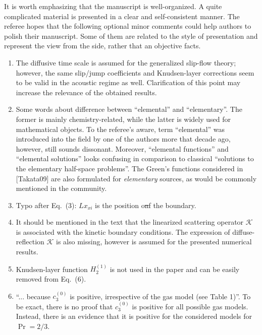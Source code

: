 \documentclass[11pt]{article}
\begin{document}
It is worth emphasizing that the manuscript is well-organized.
A quite complicated material is presented in a clear and self-consistent manner.
The referee hopes that the following optional minor comments could help authors to polish their manuscript.
Some of them are related to the style of presentation and represent the view from the side, rather that an objective facts.
\begin{enumerate}
    \item The diffusive time scale is assumed for the generalized slip-flow theory;
    however, the same slip/jump coefficients and Knudsen-layer corrections seem to be valid in the acoustic regime as well.
    Clarification of this point may increase the relevance of the obtained results.

    \item Some words about difference between ``elemental'' and ``elementary''.
    The former is mainly chemistry-related, while the latter is widely used for mathematical objects.
    To the referee's aware, term ``elemental'' was introduced into the field by one of the authors more that decade ago,
    however, still sounds dissonant.
    Moreover, ``elemental functions'' and ``elemental solutions'' looks confusing
    in comparison to classical ``solutions to the elementary half-space problems''.
    The Green's functions considered in [Takata09] are also formulated for \emph{elementary} sources,
    as would be commonly mentioned in the community.

    \item Typo after Eq.~(3): \(Lx_{xi}\) is the position o\sout{n}f the boundary.

    \item It should be mentioned in the text that the linearized scattering operator \(\mathcal{K}\)
    is associated with the kinetic boundary conditions.
    The expression of diffuse-reflection \(\mathcal{K}\) is also missing,
    however is assumed for the presented numerical results.

    \item Knudsen-layer function \(H_2^{(1)}\) is not used in the paper and can be easily removed from Eq.~(6).

    \item ``... because \(c_3^{(0)}\) is positive, irrespective of the gas model (see Table 1)''.
    To be exact, there is no proof that \(c_3^{(0)}\) is positive for all possible gas models.
    Instead, there is an evidence that it is positive for the considered models for \(\Pr=2/3\).


\end{enumerate}
\end{document}
